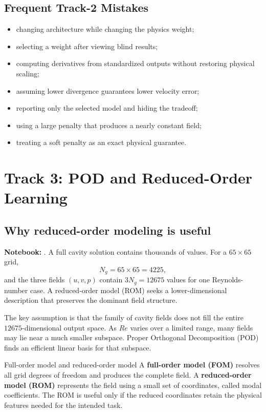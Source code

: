 \documentclass[11pt]{article}
\newcommand{\file}[1]{\path{#1}}
\begin{document}
\subsection{Frequent Track-2 Mistakes}
\begin{itemize}
\item changing architecture while changing the physics weight;
\item selecting a weight after viewing blind results;
\item computing derivatives from standardized outputs without restoring physical scaling;
\item assuming lower divergence guarantees lower velocity error;
\item reporting only the selected model and hiding the tradeoff;
\item using a large penalty that produces a nearly constant field;
\item treating a soft penalty as an exact physical guarantee.
\end{itemize}

\clearpage
\section{Track 3: POD and Reduced-Order Learning}
\subsection{Why reduced-order modeling is useful}
\textbf{Notebook:} \file{P3_POD_Study.ipynb}. A full cavity solution contains thousands of values. For a $65\times65$ grid,
\[
N_g=65\times65=4225,
\]
and the three fields $(u,v,p)$ contain $3N_g=12675$ values for one Reynolds-number case. A reduced-order model (ROM) seeks a lower-dimensional description that preserves the dominant field structure.

The key assumption is that the family of cavity fields does not fill the entire $12675$-dimensional output space. As $Re$ varies over a limited range, many fields may lie near a much smaller subspace. Proper Orthogonal Decomposition (POD) finds an efficient linear basis for that subspace.

\begin{definitionbox}{Full-order model and reduced-order model}
A \textbf{full-order model (FOM)} resolves all grid degrees of freedom and produces the complete field. A \textbf{reduced-order model (ROM)} represents the field using a small set of coordinates, called modal coefficients. The ROM is useful only if the reduced coordinates retain the physical features needed for the intended task.
\end{definitionbox}
\end{document}

